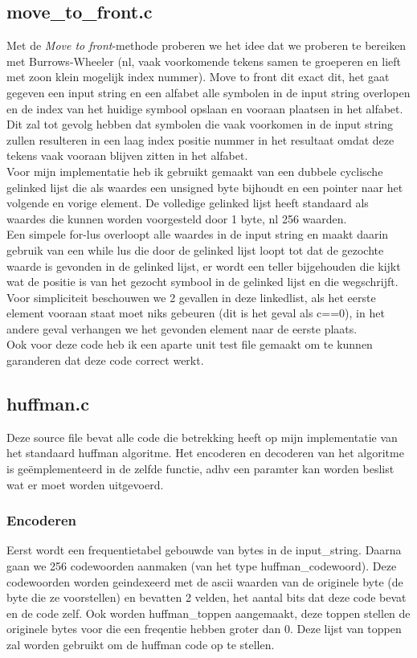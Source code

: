 \documentclass[10pt,a4paper]{report}
\begin{document}
\subsection*{move\_to\_front.c}
Met de \emph{Move to front}-methode proberen we het idee dat we proberen te bereiken met Burrows-Wheeler (nl, vaak voorkomende tekens samen te groeperen en lieft met zoon klein mogelijk index nummer). Move to front dit exact dit, het gaat gegeven een input string en een alfabet alle symbolen in de input string overlopen en de index van het huidige symbool opslaan en vooraan plaatsen in het alfabet. Dit zal tot gevolg hebben dat symbolen die vaak voorkomen in de input string zullen resulteren in een laag index positie nummer in het resultaat omdat deze tekens vaak vooraan blijven zitten in het alfabet.\\

Voor mijn implementatie heb ik gebruikt gemaakt van een dubbele cyclische gelinked lijst die als waardes een unsigned byte bijhoudt en een pointer naar het volgende en vorige element. De volledige  gelinked lijst heeft standaard als waardes die kunnen worden voorgesteld door 1 byte, nl 256 waarden.\\ 
Een simpele for-lus overloopt alle waardes in de input string en maakt daarin gebruik van een while lus die door de gelinked lijst loopt tot dat de gezochte waarde is gevonden in de gelinked lijst, er wordt een teller bijgehouden die kijkt wat de positie is van het gezocht symbool in de gelinked lijst en die wegschrijft.\\

Voor simpliciteit beschouwen we 2 gevallen in deze linkedlist, als het eerste element vooraan staat moet niks gebeuren (dit is het geval als c==0), in het andere geval verhangen we het gevonden element naar de eerste plaats.\\

Ook voor deze code heb ik een aparte unit test file gemaakt om te kunnen garanderen dat deze code correct werkt. 
\subsection*{huffman.c}
Deze source file bevat alle code die betrekking heeft op mijn implementatie van het standaard huffman algoritme. Het encoderen en decoderen van het algoritme is  ge\"emplementeerd in de zelfde functie, adhv een paramter kan worden beslist wat er moet worden uitgevoerd. \\

\subsubsection*{Encoderen}
Eerst wordt een frequentietabel gebouwde van bytes in de input\_string. Daarna gaan we 256 codewoorden aanmaken (van het type huffman\_codewoord). Deze codewoorden worden geindexeerd met de ascii waarden van de originele byte (de byte die ze voorstellen) en bevatten 2 velden, het aantal bits dat deze code bevat en de code zelf. Ook worden huffman\_toppen aangemaakt, deze toppen stellen de originele bytes voor die een freqentie hebben groter dan 0. Deze lijst van toppen zal worden gebruikt om de huffman code op te stellen. \\
\end{document}
